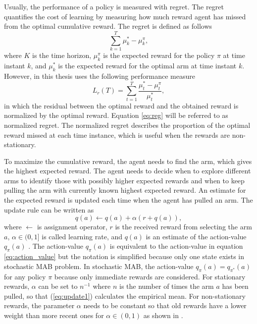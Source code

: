 \documentclass[english, 12pt, a4paper, elec, utf8, a-1b, online]{aaltothesis}
\newcommand{\regret}{L_r}
\begin{document}
Usually, the performance of a policy is measured with regret.
The regret quantifies the cost of learning by measuring how much reward agent has missed from the optimal cumulative reward.
The regret is defined as follows
\begin{equation*}
    \sum_{k=1}^T \mu^*_k - \mu^\pi_k,
\end{equation*}
where $K$ is the time horizon, $\mu^\pi_k$ is the expected reward for the policy $\pi$ at time instant $k$, and $\mu_k^*$ is the expected reward for the optimal arm at time instant $k$.
However, in this thesis uses the following performance measure
\begin{equation}\label{eq:reg}
    \regret(T) = \sum_{t=1}^T \frac{\mu^*_t - \mu^\pi_t}{\mu^*_t},
\end{equation}
in which the residual between the optimal reward and the obtained reward is normalized by the optimal reward.
Equation \eqref{eq:reg} will be referred to as normalized regret.
The normalized regret describes the proportion of the optimal reward missed at each time instance, which is useful when the rewards are non-stationary.

To maximize the cumulative reward, the agent needs to find the arm, which gives the highest expected reward.
The agent needs to decide when to explore different arms to identify those with possibly higher expected rewards and when to keep pulling the arm with currently known highest expected reward.
An estimate for the expected reward is updated each time when the agent has pulled an arm.
The update rule can be written as
\begin{equation}\label{eq:update1}
    q(a) \leftarrow q(a) + \alpha \left(r + q(a)\right),
\end{equation}
where $\leftarrow$ is assignment operator, $r$ is the received reward from selecting the arm $a$, $\alpha \in (0, 1]$ is called learning rate, and $q(a)$ is an estimate of the action-value $q_{\pi}(a)$ \cite{Sutton2018}.
The action-value $q_\pi(a)$ is equivalent to the action-value in equation \eqref{eq:action_value} but the notation is simplified because only one state exists in stochastic MAB problem.   
In stochastic MAB, the action-value $q_{\pi}(a)=q_{\pi^*}(a)$ for any policy $\pi$ because only immediate rewards are considered. 
For stationary rewards, $\alpha$ can be set to $n^{-1}$ where $n$ is the number of times the arm $a$ has been pulled, so that (\ref{eq:update1}) calculates the empirical mean. 
For non-stationary rewards, the parameter $\alpha$ needs to be constant so that old rewards have a lower weight than more recent ones for $\alpha \in (0, 1)$ as shown in \cite{Sutton2018}.
\end{document}
